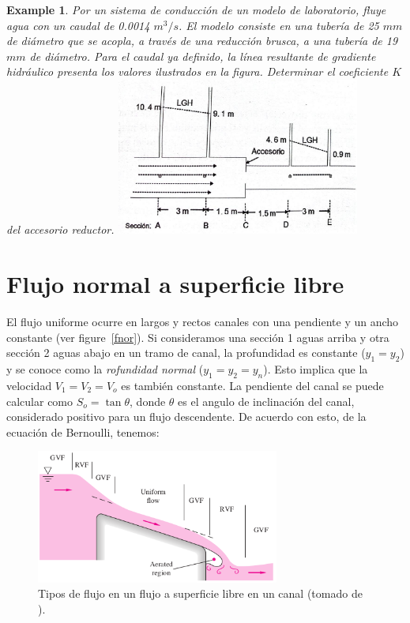 \documentclass[11pt, oneside]{article}
\newtheorem{exa}{Example}
\begin{document}
\begin{shaded}
\begin{exa}
Por un sistema de conducci\'on de un modelo de laboratorio, fluye agua con un caudal de 0.0014 $m^3/s$. El modelo consiste en una tuber\'ia de 25 $mm$ de di\'ametro que se acopla, a trav\'es de una reducci\'on brusca, a una tuber\'ia de 19 $mm$ de di\'ametro. Para el caudal ya definido, la l\'inea resultante de gradiente hidr\'aulico presenta los valores ilustrados en la figura. Determinar el coeficiente $K$ del accesorio reductor.
\includegraphics[width=8cm]{exa30.jpeg}
\end{exa}
\end{shaded}

\section{Flujo normal a superficie libre}
El flujo uniforme ocurre en largos y rectos canales con una pendiente y un ancho constante (ver figure~\ref{fnor}). Si consideramos una secci\'on 1 aguas arriba y otra secci\'on 2 aguas abajo en un tramo de canal, la profundidad es constante ($y_1 = y_2$) y se conoce como la \emph{rofundidad normal} ($y_1 = y_2 = y_n$). Esto implica que la velocidad $V_1 = V_2 = V_o$ es tambi\'en constante. La pendiente del canal se puede calcular como $S_o = \tan \theta$, donde $\theta$ es el angulo de inclinaci\'on del canal, considerado positivo para un flujo descendente. De acuerdo con esto, de la ecuaci\'on de Bernoulli, tenemos:

\begin{figure}[h]
\centering
\includegraphics[width=8cm]{fnor1.png}
\caption{Tipos de flujo en un flujo a superficie libre en un canal (tomado de \cite{white1990fluid}).}
\label{fnor1}
\end{figure}
\end{document}
